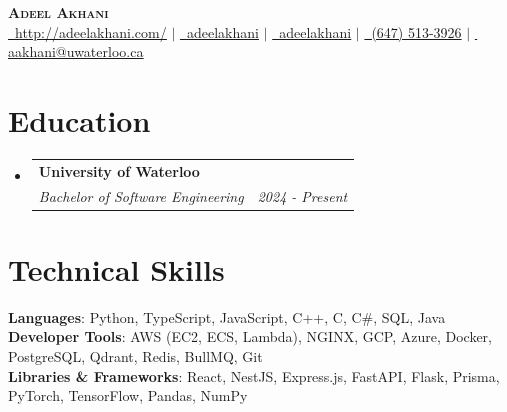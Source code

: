 \documentclass[letterpaper,11pt]{article}
\makeatletter
\newcommand{\resumeSubheading}[4]{
  \vspace{-2pt}\item
    \begin{tabular*}{0.97\textwidth}[t]{l@{\extracolsep{\fill}}r}
      \textbf{#1} & #2 \\
      \textit{\small#3} & \textit{\small #4} \\
    \end{tabular*}\vspace{-7pt}
}
\newcommand{\resumeSubHeadingListStart}{\begin{itemize}[leftmargin=0.15in, label={}]}
\newcommand{\resumeSubHeadingListEnd}{\end{itemize}}
\makeatother
\begin{document}
\begin{center}
    \textbf{\Huge \scshape Adeel Akhani} \\ \vspace{1pt}
    \small
    \href{http://adeelakhani.com/}{\faGlobe\, \underline{http://adeelakhani.com/}} $|$
    \href{https://www.linkedin.com/in/adeelakhani/}{\faLinkedin\, \underline{adeelakhani}} $|$ 
    \href{https://github.com/adeelakhani}{\faGithub\, \underline{adeelakhani}} $|$
    \href{tel:(647) 513-3926}{\faMobile*\, (647) 513-3926} $|$
    \href{mailto:aakhani@uwaterloo.ca}{\faEnvelope\, \underline{aakhani@uwaterloo.ca}}
\end{center}
\section{Education}
    \resumeSubHeadingListStart
        \resumeSubheading
            {University of Waterloo}{}
            {Bachelor of Software Engineering}{\textit{2024 - Present}}
        \resumeSubHeadingListEnd
\section{Technical Skills}
\begin{itemize}[leftmargin=0.15in, label={}]
    \small{\item{
    \textbf{Languages}{: Python, TypeScript, JavaScript, C++, C, C\#, SQL, Java} \\
    \textbf{Developer Tools}{: AWS (EC2, ECS, Lambda), NGINX, GCP, Azure, Docker, PostgreSQL, Qdrant, Redis, BullMQ, Git} \\
    \textbf{Libraries \& Frameworks}{: React, NestJS, Express.js, FastAPI, Flask, Prisma, PyTorch, TensorFlow, Pandas, NumPy} 
    }}
\end{itemize}
\end{document}
